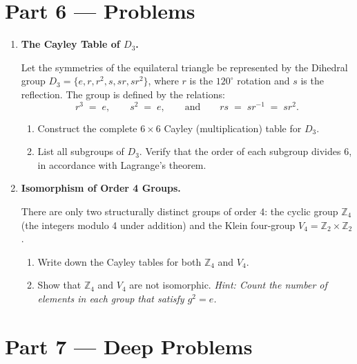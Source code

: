 \documentclass[12pt, a4paper]{article}
\begin{document}
\newpage

\section{Part 6 --- Problems}

\begin{enumerate}[label=\textbf{P\arabic*.}]
  \item \textbf{The Cayley Table of $D_3$.}
  
        Let the symmetries of the equilateral triangle be represented by the Dihedral group $D_3 = \{e, r, r^2, s, sr, sr^2\}$, where $r$ is the $120^\circ$ rotation and $s$ is the reflection. The group is defined by the relations:
        \[
          r^3 \;=\; e, \qquad s^2 \;=\; e, \qquad \text{and} \qquad rs \;=\; sr^{-1} \;=\; sr^2.
        \]
        \begin{enumerate}[label=(\alph*)]
          \item Construct the complete $6 \times 6$ Cayley (multiplication) table for $D_3$.
          \item List all subgroups of $D_3$. Verify that the order of each subgroup divides 6, in accordance with Lagrange's theorem.
        \end{enumerate}

  \item \textbf{Isomorphism of Order 4 Groups.}
  
        There are only two structurally distinct groups of order 4: the cyclic group $\mathbb{Z}_4$ (the integers modulo 4 under addition) and the Klein four-group $V_4 = \mathbb{Z}_2 \times \mathbb{Z}_2$.
        \begin{enumerate}[label=(\alph*)]
          \item Write down the Cayley tables for both $\mathbb{Z}_4$ and $V_4$.
          \item Show that $\mathbb{Z}_4$ and $V_4$ are not isomorphic. \textit{Hint: Count the number of elements in each group that satisfy $g^2 = e$.}
        \end{enumerate}
\end{enumerate}

\newpage

\section{Part 7 --- Deep Problems}
\end{document}
